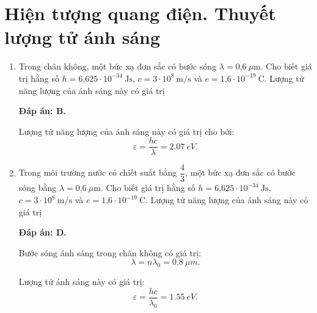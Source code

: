 \whiteBGstarBegin
\setcounter{section}{0}
\section{Hiện tượng quang điện. Thuyết lượng tử ánh sáng}
\begin{enumerate}[label=\bfseries Câu \arabic*:]
	\item {} 
	
	\cauhoi
	{Trong chân không, một bức xạ đơn sắc có bước sóng $\lambda =\text{0,6}\ \mu\text{m}$. Cho biết giá trị hằng số $h=\text{6,625}\cdot 10^{-34}\ \text{Js}$, $c=3\cdot 10^8\ \text{m/s}$ và $e=\text{1,6}\cdot 10^{-19}\ \text{C}$. Lượng tử năng lượng của ánh sáng này có giá trị
	}
	
	\loigiai
	{		\textbf{Đáp án: B.}
		
Lượng tử năng lượng của ánh sáng này có giá trị cho bởi:
$$
	\varepsilon = \dfrac{hc}{\lambda} = \SI{2,07}{eV}.
$$
		
	}
	
	\item {} 
	
	\cauhoi
	{Trong môi trường nước có chiết suất bằng $\dfrac{4}{3}$, một bức xạ đơn sắc có bước sóng bằng $\lambda =\text{0,6}\ \mu\text{m}$. Cho biết giá trị hằng số $h=\text{6,625}\cdot 10^{-34}\ \text{Js}$, $c=3\cdot 10^8\ \text{m/s}$ và $e=\text{1,6}\cdot 10^{-19}\ \text{C}$. Lượng tử năng lượng của ánh sáng này có giá trị
	}
	
	\loigiai
	{		\textbf{Đáp án: D.}
	
Bước sóng ánh sáng trong chân không có giá trị:
$$
	\lambda = n \lambda_{0} = \SI{0,8}{\mu m}.
$$
		
Lượng tử ánh sáng này có giá trị:
$$
	\varepsilon = \dfrac{hc}{\lambda_{0}} = \SI{1,55}{eV}.
$$
		
}
\end{enumerate}
